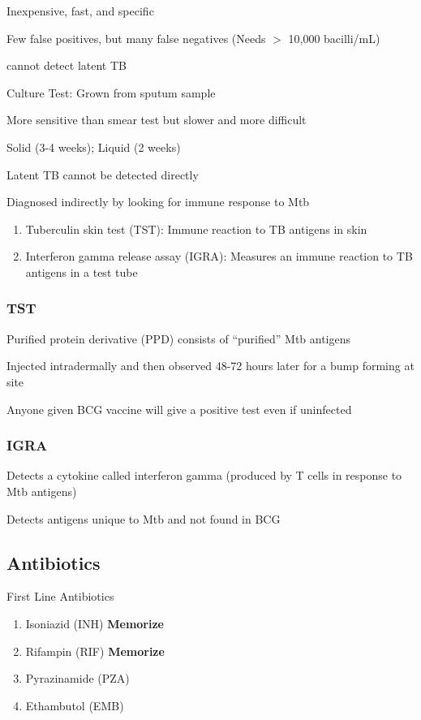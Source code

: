 \documentclass{notes}
\begin{document}
\tab \indicates Inexpensive, fast, and specific

\tab \indicates Few false positives, but many false negatives (Needs \(>\) 10,000 bacilli/mL)

\tab \indicates cannot detect latent TB

Culture Test: Grown from sputum sample

\tab \indicates More sensitive than smear test but slower and more difficult

\tab \indicates Solid (3-4 weeks); Liquid (2 weeks)

Latent TB cannot be detected directly

\tab \indicates Diagnosed indirectly by looking for immune response to Mtb

\begin{enumerate}
    \item Tuberculin skin test (TST): Immune reaction to TB antigens in skin
    \item Interferon gamma release assay (IGRA): Measures an immune reaction to TB antigens in a test tube
\end{enumerate}

\subsubsection*{TST}
Purified protein derivative (PPD) consists of ``purified'' Mtb antigens

Injected intradermally and then observed 48-72 hours later for a bump forming at site

Anyone given BCG vaccine will give a positive test even if uninfected

\subsubsection*{IGRA}
Detects a cytokine called interferon gamma (produced by T cells in response to Mtb antigens)

Detects antigens unique to Mtb and not found in BCG

\subsection*{Antibiotics}

First Line Antibiotics
\begin{enumerate}
    \item Isoniazid (INH) \textbf{Memorize}
    \item Rifampin (RIF) \textbf{Memorize}
    \item Pyrazinamide (PZA)
    \item Ethambutol (EMB)
\end{enumerate}
\end{document}
